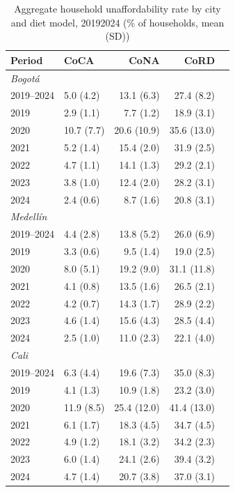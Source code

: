 \begin{table}[htbp]
\centering
\begingroup
\fontsize{8}{9.5}\selectfont
\setlength{\tabcolsep}{4pt}
\renewcommand{\arraystretch}{0.95}
\caption{Aggregate household unaffordability rate by city and diet model, 2019\textendash{}2024 (\% of households, mean (SD))}
\label{tab:afford_annual}
\begin{tabular}{llrrr}
\toprule
Period & CoCA & CoNA & CoRD \\
\midrule
\multicolumn{4}{l}{\textit{Bogotá}} \\
2019–2024 & 5.0 (4.2) & 13.1 (6.3) & 27.4 (8.2) \\
2019 & 2.9 (1.1) & 7.7 (1.2) & 18.9 (3.1) \\
2020 & 10.7 (7.7) & 20.6 (10.9) & 35.6 (13.0) \\
2021 & 5.2 (1.4) & 15.4 (2.0) & 31.9 (2.5) \\
2022 & 4.7 (1.1) & 14.1 (1.3) & 29.2 (2.1) \\
2023 & 3.8 (1.0) & 12.4 (2.0) & 28.2 (3.1) \\
2024 & 2.4 (0.6) & 8.7 (1.6) & 20.8 (3.1) \\
\midrule
\multicolumn{4}{l}{\textit{Medellín}} \\
2019–2024 & 4.4 (2.8) & 13.8 (5.2) & 26.0 (6.9) \\
2019 & 3.3 (0.6) & 9.5 (1.4) & 19.0 (2.5) \\
2020 & 8.0 (5.1) & 19.2 (9.0) & 31.1 (11.8) \\
2021 & 4.1 (0.8) & 13.5 (1.6) & 26.5 (2.1) \\
2022 & 4.2 (0.7) & 14.3 (1.7) & 28.9 (2.2) \\
2023 & 4.6 (1.4) & 15.6 (4.3) & 28.5 (4.4) \\
2024 & 2.5 (1.0) & 11.0 (2.3) & 22.1 (4.0) \\
\midrule
\multicolumn{4}{l}{\textit{Cali}} \\
2019–2024 & 6.3 (4.4) & 19.6 (7.3) & 35.0 (8.3) \\
2019 & 4.1 (1.3) & 10.9 (1.8) & 23.2 (3.0) \\
2020 & 11.9 (8.5) & 25.4 (12.0) & 41.4 (13.0) \\
2021 & 6.1 (1.7) & 18.3 (4.5) & 34.7 (4.5) \\
2022 & 4.9 (1.2) & 18.1 (3.2) & 34.2 (2.3) \\
2023 & 6.0 (1.4) & 24.1 (2.6) & 39.4 (3.2) \\
2024 & 4.7 (1.4) & 20.7 (3.8) & 37.0 (3.1) \\
\bottomrule
\end{tabular}
\vspace{0.5em}
\endgroup
\end{table}
